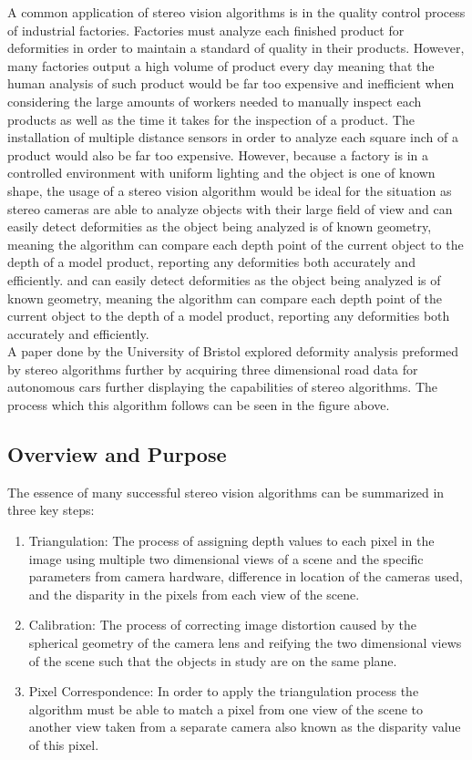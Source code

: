 \documentclass[11pt]{scrartcl}
\begin{document}
A common application of stereo vision algorithms is in the quality
control process of industrial factories. Factories must analyze each
finished product for deformities in order to maintain a standard of quality in their
products. However, many factories output a high volume of product every day meaning that
the human analysis of such product would be far too expensive and inefficient when
considering the large amounts of workers needed to manually inspect each products
as well as the time it takes for the inspection of a product. The installation of multiple
distance sensors in order to analyze each square inch of a product would also be far too expensive.
However, because a factory is in a controlled environment with uniform lighting and the object is one
of known shape, the usage of a stereo vision algorithm would be ideal for the situation as stereo cameras
are able to analyze objects with their large field of view and can easily detect deformities as the object
being analyzed is of known geometry, meaning the algorithm can compare each depth point of the current object
to the depth of a model product, reporting any deformities both accurately and efficiently.  and can easily detect deformities as the object
being analyzed is of known geometry, meaning the algorithm can compare each depth point of the current object
to the depth of a model product, reporting any deformities both accurately and efficiently. \\

A paper done by the University of Bristol explored deformity analysis preformed by stereo algorithms
further by acquiring three dimensional road data for autonomous cars further displaying the
capabilities of stereo algorithms. The process which this algorithm follows can be seen in the
figure above.

\subsection{Overview and Purpose}

The essence of many successful stereo vision algorithms can be summarized in three key steps:
{\begin{enumerate}

  \item Triangulation: The process of assigning depth values to each pixel in the image
        using multiple two dimensional views of a scene and the specific parameters from
        camera hardware, difference in location of the cameras used, and the disparity in the
        pixels from each view of the scene.
  \item Calibration: The process of correcting image distortion caused by the
        spherical geometry of the camera lens
        and reifying the two dimensional views of the scene such that
        the objects in study are on the same plane.
  \item Pixel Correspondence: In order to apply the triangulation process the algorithm must be
        able to match a pixel from one view of the scene to another view taken from a separate camera
        also known as the disparity value of this pixel.
\end{enumerate}}
\end{document}
